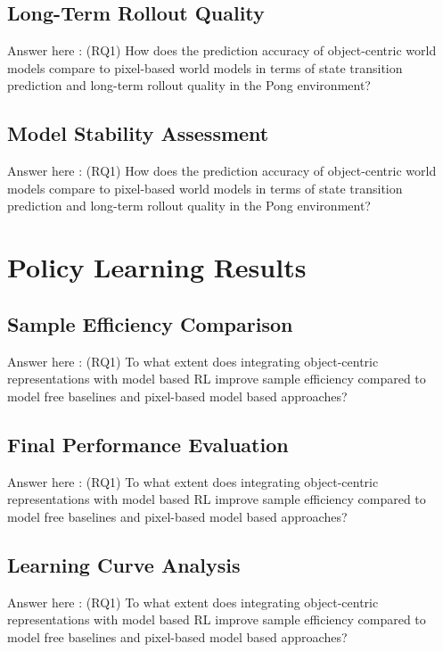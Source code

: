 \documentclass[
	english,
	ruledheaders=section,
	class=report,
	thesis={type=master},
	accentcolor=9c,
	custommargins=true,
	marginpar=false,
	parskip=half-,
	fontsize=11pt,
]{tudapub}
\begin{document}
\subsection{Long-Term Rollout Quality}
\label{subsec:rollout_quality}
Answer here : (RQ1) How does the prediction accuracy of object-centric world models compare to pixel-based world models in terms of state transition prediction and long-term rollout quality in the Pong environment?

\subsection{Model Stability Assessment}
\label{subsec:stability}
Answer here : (RQ1) How does the prediction accuracy of object-centric world models compare to pixel-based world models in terms of state transition prediction and long-term rollout quality in the Pong environment?

\section{Policy Learning Results}
\label{sec:policy_results}

\subsection{Sample Efficiency Comparison}
\label{subsec:sample_efficiency_comp}
Answer here : (RQ1) To what extent does integrating object-centric representations with model based RL improve sample efficiency compared to model free baselines and pixel-based model based approaches?

\subsection{Final Performance Evaluation}
\label{subsec:final_performance}
Answer here : (RQ1) To what extent does integrating object-centric representations with model based RL improve sample efficiency compared to model free baselines and pixel-based model based approaches?

\subsection{Learning Curve Analysis}
\label{subsec:learning_curves}
Answer here : (RQ1) To what extent does integrating object-centric representations with model based RL improve sample efficiency compared to model free baselines and pixel-based model based approaches?
\end{document}
